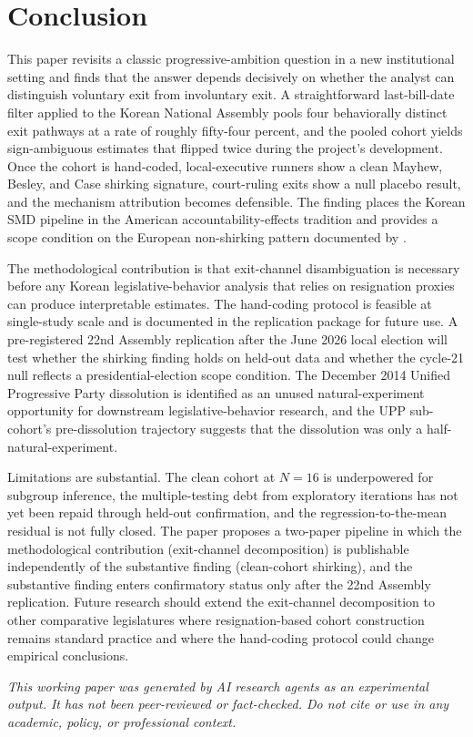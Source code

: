\documentclass[11pt]{article}
\begin{document}
\section{Conclusion}

This paper revisits a classic progressive-ambition question in a new institutional setting and finds that the answer depends decisively on whether the analyst can distinguish voluntary exit from involuntary exit. A straightforward last-bill-date filter applied to the Korean National Assembly pools four behaviorally distinct exit pathways at a rate of roughly fifty-four percent, and the pooled cohort yields sign-ambiguous estimates that flipped twice during the project's development. Once the cohort is hand-coded, local-executive runners show a clean Mayhew, Besley, and Case shirking signature, court-ruling exits show a null placebo result, and the mechanism attribution becomes defensible. The finding places the Korean SMD pipeline in the American accountability-effects tradition and provides a scope condition on the European non-shirking pattern documented by \citet{hansen2015}.

The methodological contribution is that exit-channel disambiguation is necessary before any Korean legislative-behavior analysis that relies on resignation proxies can produce interpretable estimates. The hand-coding protocol is feasible at single-study scale and is documented in the replication package for future use. A pre-registered 22nd Assembly replication after the June 2026 local election will test whether the shirking finding holds on held-out data and whether the cycle-21 null reflects a presidential-election scope condition. The December 2014 Unified Progressive Party dissolution is identified as an unused natural-experiment opportunity for downstream legislative-behavior research, and the UPP sub-cohort's pre-dissolution trajectory suggests that the dissolution was only a half-natural-experiment.

Limitations are substantial. The clean cohort at $N=16$ is underpowered for subgroup inference, the multiple-testing debt from exploratory iterations has not yet been repaid through held-out confirmation, and the regression-to-the-mean residual is not fully closed. The paper proposes a two-paper pipeline in which the methodological contribution (exit-channel decomposition) is publishable independently of the substantive finding (clean-cohort shirking), and the substantive finding enters confirmatory status only after the 22nd Assembly replication. Future research should extend the exit-channel decomposition to other comparative legislatures where resignation-based cohort construction remains standard practice and where the hand-coding protocol could change empirical conclusions.

\bigskip
\noindent\textit{This working paper was generated by AI research agents as an experimental output. It has not been peer-reviewed or fact-checked. Do not cite or use in any academic, policy, or professional context.}



\end{document}
